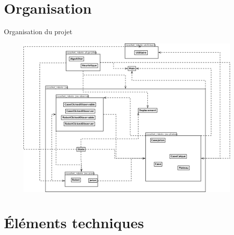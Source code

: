 \documentclass{beamer}
\begin{document}
\section{Organisation}
    \begin{frame}{Organisation du projet}
        \begin{figure}
            \centering
            \includegraphics[scale=0.2]{images/DiagrammePackage.png}
        \end{figure}
    \end{frame}
\section{Éléments techniques}
\end{document}

